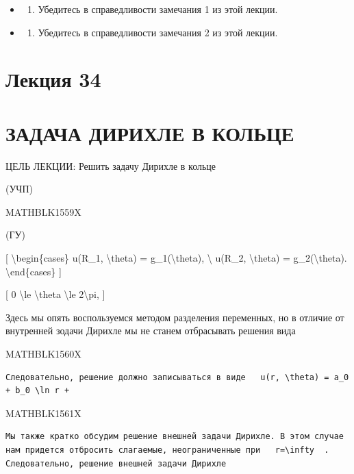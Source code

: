 \documentclass[
]{article}
\providecommand{\tightlist}{%
  \setlength{\itemsep}{0pt}\setlength{\parskip}{0pt}}
\begin{document}
\begin{itemize}
\tightlist
\item
  \begin{enumerate}
  \def\labelenumi{\arabic{enumi}.}
  \setcounter{enumi}{6}
  \tightlist
  \item
    Убедитесь в справедливости замечания 1 из этой лекции.
  \end{enumerate}
\item
  \begin{enumerate}
  \def\labelenumi{\arabic{enumi}.}
  \setcounter{enumi}{7}
  \tightlist
  \item
    Убедитесь в справедливости замечания 2 из этой лекции.
  \end{enumerate}
\end{itemize}

\section{Лекция 34}\label{ux43bux435ux43aux446ux438ux44f-34}

\section{ЗАДАЧА ДИРИХЛЕ В
КОЛЬЦЕ}\label{ux437ux430ux434ux430ux447ux430-ux434ux438ux440ux438ux445ux43bux435-ux432-ux43aux43eux43bux44cux446ux435}

ЦЕЛЬ ЛЕКЦИИ: Решить задачу Дирихле в кольце

(УЧП)

MATHBLK1559X

(ГУ)

{[} \textbackslash begin\{cases\} u(R\_1, \textbackslash theta) =
g\_1(\textbackslash theta), \textbackslash{} u(R\_2,
\textbackslash theta) = g\_2(\textbackslash theta).
\textbackslash end\{cases\} {]}

{[} 0 \textbackslash le \textbackslash theta \textbackslash le
2\textbackslash pi, {]}

Здесь мы опять воспользуемся методом разделения переменных, но в отличие
от внутренней зодачи Дирихле мы не станем отбрасывать решения вида

MATHBLK1560X

\begin{verbatim}
Следовательно, решение должно записываться в виде   u(r, \theta) = a_0 + b_0 \ln r +
\end{verbatim}

MATHBLK1561X

\begin{verbatim}
Мы также кратко обсудим решение внешней задачи Дирихле. В этом случае нам придется отбросить слагаемые, неограниченные при   r=\infty  . Следовательно, решение внешней задачи Дирихле
\end{verbatim}
\end{document}
